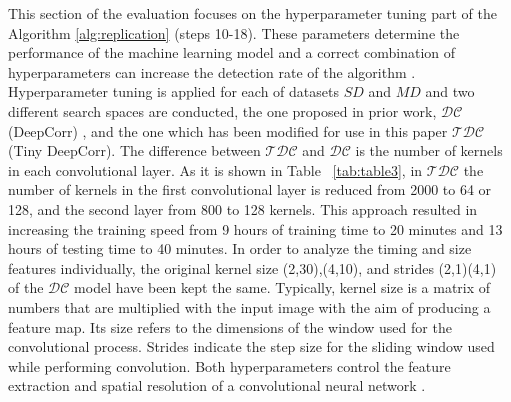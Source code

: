 \documentclass[sigconf]{acmart}
\begin{document}
This section of the evaluation focuses on the hyperparameter tuning part of the Algorithm \ref{alg:replication} (steps 10-18). These parameters determine the performance of the machine learning model and a correct combination of hyperparameters can increase the detection rate of the algorithm \cite{weerts2020importance}. Hyperparameter tuning is applied for each of datasets $SD$ and $MD$ and two different search spaces are conducted, the one proposed in prior work, \( \mathcal{DC} \) (DeepCorr) \cite{nasr2018deepcorr}, and the one which has been modified for use in this paper \( \mathcal{TDC} \) (Tiny DeepCorr). The difference between \( \mathcal{TDC} \) and \( \mathcal{DC} \) is the number of kernels in each convolutional layer. As it is shown in Table ~\ref{tab:table3}, in \( \mathcal{TDC} \) the number of kernels in the first convolutional layer is reduced from 2000 to 64 or 128, and the second layer from 800 to 128 kernels. This approach resulted in increasing the training speed from 9 hours of training time to 20 minutes and 13 hours of testing time to 40 minutes.
In order to analyze the timing and size features individually, the original kernel size (2,30),(4,10), and strides (2,1)(4,1) of the \( \mathcal{DC} \) model have been kept the same. Typically, kernel size is a matrix of numbers that are multiplied with the input image with the aim of producing a feature map. Its size refers to the dimensions of the window used for the convolutional process. Strides indicate the step size for the sliding window used while performing convolution. Both hyperparameters control the feature extraction and spatial resolution of a convolutional neural network \cite{Convolution_Arithmetic}.
\end{document}
